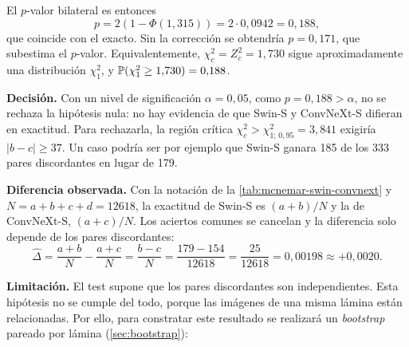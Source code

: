 El $p$-valor bilateral es entonces
\[
  p = 2\left(1 - \Phi(1{,}315)\right) = 2 \cdot 0{,}0942 = 0{,}188,
\]
que coincide con el exacto. Sin la corrección se obtendría $p = 0{,}171$, que subestima el $p$-valor. Equivalentemente, $\chi^2_c = Z_c^2 = 1{,}730$ sigue aproximadamente una distribución $\chi^2_1$, y $\mathbb{P}(\chi^2_1 \geq 1{,}730) = 0{,}188$.

\textbf{Decisión.} Con un nivel de significación $\alpha = 0{,}05$, como $p = 0{,}188 > \alpha$, no se rechaza la hipótesis nula: no hay evidencia de que Swin-S y ConvNeXt-S difieran en exactitud. Para rechazarla, la región crítica $\chi^2_c > \chi^2_{1;\,0{,}95} = 3{,}841$ exigiría $|b - c| \geq 37$. Un caso podría ser por ejemplo que Swin-S ganara 185 de los 333 pares discordantes en lugar de 179.

\textbf{Diferencia observada.} Con la notación de la \cref{tab:mcnemar-swin-convnext} y $N = a + b + c + d = \num{12618}$, la exactitud de Swin-S es $(a + b)/N$ y la de ConvNeXt-S, $(a + c)/N$. Los aciertos comunes se cancelan y la diferencia solo depende de los pares discordantes:
\[
  \hat\Delta = \frac{a + b}{N} - \frac{a + c}{N} = \frac{b - c}{N} = \frac{179 - 154}{\num{12618}} = \frac{25}{\num{12618}} = 0{,}00198 \approx +0{,}0020.
\]

\textbf{Limitación.} El test supone que los pares discordantes son independientes. Esta hipótesis no se cumple del todo, porque las imágenes de una misma lámina están relacionadas. Por ello, para constratar este resultado se realizará un \emph{bootstrap} pareado por lámina (\cref{sec:bootstrap}):

